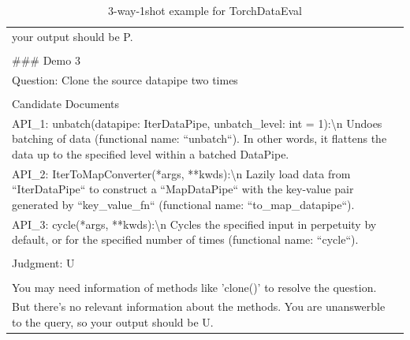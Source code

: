 \begin{table}[t!]
\begin{tabularx}{\textwidth}{|X|}
your output should be P.\\ \\ \#\#\# Demo 3\\ Question: Clone the source datapipe two times\\ \\ Candidate Documents\\ API\_1: unbatch(datapipe: IterDataPipe, unbatch\_level: int = 1):\textbackslash{}n    Undoes batching of data (functional name: ``unbatch``). In other words, it flattens the data up to the specified level within a batched DataPipe.\\ API\_2: IterToMapConverter(*args, **kwds):\textbackslash{}n    Lazily load data from ``IterDataPipe`` to construct a ``MapDataPipe`` with the key-value pair generated by ``key\_value\_fn`` (functional name: ``to\_map\_datapipe``).\\ API\_3: cycle(*args, **kwds):\textbackslash{}n    Cycles the specified input in perpetuity by default, or for the specified number of times (functional name: ``cycle``).\\ \\ Judgment: U\\ \\ You may need information of methods like 'clone()' to resolve the question.\\ But there's no relevant information about the methods. You are unanswerble to the query, so your output should be U. \\ \hline
\end{tabularx}
\caption{3-way-1shot example for TorchDataEval}
\label{tab:2shot_prompt_torchdataeval}
\end{table}